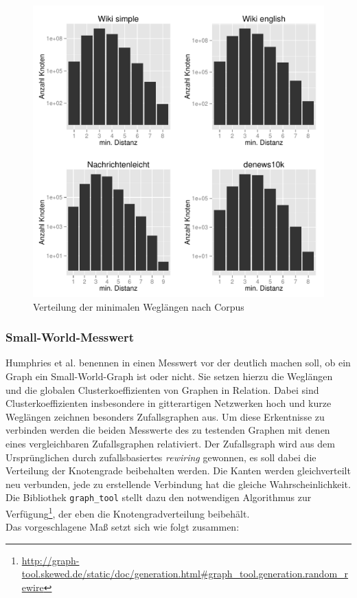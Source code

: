 \documentclass[11pt, a4paper]{article}
\begin{document}
\begin{figure}[ht]
    \centering
        \includegraphics[scale=.75]{mdh_plots.pdf}
    \caption{Verteilung der minimalen Weglängen nach Corpus}
    \label{fig-mdh}
\end{figure}

\subsubsection{Small-World-Messwert}
Humphries et al. benennen in \cite{Humphries2006} einen Messwert vor der deutlich
machen soll, ob ein Graph ein Small-World-Graph ist oder nicht. Sie setzen hierzu
die Weglängen und die globalen Clusterkoeffizienten von Graphen in Relation. 
Dabei sind Clusterkoeffizienten insbesondere in gitterartigen Netzwerken hoch und
kurze Weglängen zeichnen besonders Zufallsgraphen aus. Um diese Erkentnisse zu
verbinden werden die beiden Messwerte des zu testenden Graphen mit denen eines
vergleichbaren Zufallsgraphen relativiert. Der Zufallsgraph wird aus dem 
Ursprünglichen durch zufallsbasiertes \emph{rewiring} gewonnen, es soll dabei die
Verteilung der Knotengrade beibehalten werden. Die Kanten werden gleichverteilt
neu verbunden, jede zu erstellende Verbindung hat die gleiche Wahrscheinlichkeit.
Die Bibliothek \texttt{graph\_tool} stellt dazu den notwendigen Algorithmus zur 
Verfügung\footnote{\url{http://graph-tool.skewed.de/static/doc/generation.html\#graph_tool.generation.random_rewire}},
der eben die Knotengradverteilung beibehält.\\
Das vorgeschlagene Maß setzt sich wie folgt zusammen:
\end{document}
